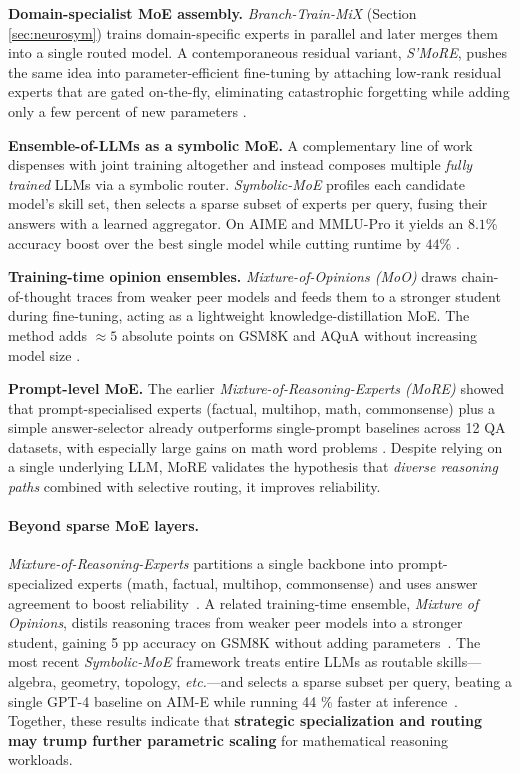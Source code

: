 \documentclass[acmsmall,anonymous]{acmart}
\begin{document}
\textbf{Domain-specialist MoE assembly.}  
\emph{Branch-Train-MiX} (Section \ref{sec:neurosym}) trains domain-specific
experts in parallel and later merges them into a single routed model.
A contemporaneous residual variant, \emph{S’MoRE}, pushes the same idea
into parameter-efficient fine-tuning by attaching low-rank residual experts
that are gated on-the-fly, eliminating catastrophic forgetting while
adding only a few percent of new parameters
\citep{zeng2025smore}.

\textbf{Ensemble-of-LLMs as a symbolic MoE.}  
A complementary line of work dispenses with joint training altogether
and instead composes multiple \emph{fully trained} LLMs via a symbolic
router.  \emph{Symbolic-MoE} profiles each candidate model’s skill set,
then selects a sparse subset of experts per query, fusing their answers
with a learned aggregator.  On AIME and MMLU-Pro it yields an
$8.1\%$ accuracy boost over the best single model while cutting runtime
by $44\%$ \citep{chen2025symbolicmoe}.

\textbf{Training-time opinion ensembles.}  
\emph{Mixture-of-Opinions (MoO)} draws chain-of-thought traces from
weaker peer models and feeds them to a stronger student during fine-tuning,
acting as a lightweight knowledge-distillation MoE.  The method adds
$\approx5$ absolute points on GSM8K and AQuA without increasing model
size \citep{chen2025mixtureopinions}.

\textbf{Prompt-level MoE.}  
The earlier \emph{Mixture-of-Reasoning-Experts (MoRE)} showed that
prompt-specialised experts (factual, multihop, math, commonsense) plus a
simple answer-selector already outperforms single-prompt baselines across
12 QA datasets, with especially large gains on math word problems
\citep{si2023more}.  Despite relying on a single underlying LLM, MoRE
validates the hypothesis that \emph{diverse reasoning paths} combined
with selective routing, it improves reliability.

\paragraph{Beyond sparse MoE layers.}
\emph{Mixture-of-Reasoning-Experts} partitions a single backbone into
prompt-specialized experts (math, factual, multihop, commonsense) and
uses answer agreement to boost reliability~\cite{si2023more}. A related
training-time ensemble, \emph{Mixture of Opinions}, distils reasoning
traces from weaker peer models into a stronger student, gaining
5 pp accuracy on GSM8K without adding parameters~\cite{chen2025moo}. The
most recent \emph{Symbolic-MoE} framework treats entire LLMs as routable
skills—algebra, geometry, topology, \emph{etc.}—and selects a sparse
subset per query, beating a single GPT-4 baseline on AIM-E while running
44 \% faster at inference~\cite{chen2025symbolicmoe}. Together, these
results indicate that \textbf{strategic specialization and routing may
trump further parametric scaling} for mathematical reasoning workloads.
\end{document}
